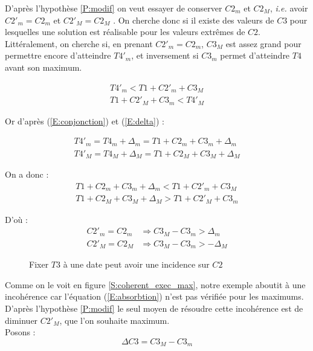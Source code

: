 \documentclass[10pt,a4paper]{article}
\newcommand{\hyporef}[1]{l'hypothèse \ref{#1}}
\begin{document}
D'après \hyporef{P:modif} on veut essayer de conserver $C2_m$ et $C2_M$, \textit{i.e.} avoir $C2'_m = C2_m$ et $C2'_M = C2_M$ . On cherche donc si il existe des valeurs de $C3$ pour lesquelles une solution est réalisable pour les valeurs extrêmes de $C2$. Littéralement, on cherche si, en prenant $C2'_m = C2_m$, $C3_M$ est assez grand pour permettre encore d'atteindre $T4'_m$, et inversement si $C3_m$ permet d'atteindre $T4$ avant son maximum.

	\begin{eqnarray}
		T4'_m < T1 + C2'_m + C3_M \\
		T1 + C2'_M + C3_m < T4'_M \nonumber
	\end{eqnarray}

Or d'après (\ref{E:conjonction}) et (\ref{E:delta}) :

	\begin{eqnarray}
		T4'_m = T4_m + \Delta{}_m = T1 + C2_m + C3_m + \Delta{}_m \\
		T4'_M = T4_M + \Delta{}_M = T1 + C2_M + C3_M + \Delta{}_M \nonumber
	\end{eqnarray}

On a donc :
	\begin{eqnarray}
		\label{E:comparaison}
		T1 + C2_m + C3_m + \Delta{}_m < T1 + C2'_m + C3_M \\
		T1 + C2_M + C3_M + \Delta{}_M > T1 + C2'_M + C3_m  \nonumber
	\end{eqnarray}

D'où :
	\begin{eqnarray}
		\label{E:absorbtion}
		C2'_m = C2_m &\Rightarrow C3_M - C3_m > \Delta{}_m \\
		C2'_M = C2_M &\Rightarrow C3_M - C3_m > -\Delta{}_M \nonumber
	\end{eqnarray}


	\begin{figure}[htp]
		\begin{center}
			\hspace{5pt}
	
		\caption{Fixer $T3$ à une date peut avoir une incidence sur $C2$}
		\end{center}
	\end{figure}

Comme on le voit en figure \ref{S:coherent_exec_max}, notre exemple aboutit à une incohérence car l'équation (\ref{E:absorbtion}) n'est pas vérifiée pour les maximums. D'après \hyporef{P:modif} le seul moyen de résoudre cette incohérence est de diminuer $C2'_M$, que l'on souhaite maximum. \\
Posons : $$\Delta{C3} = C3_M - C3_m$$
\end{document}

